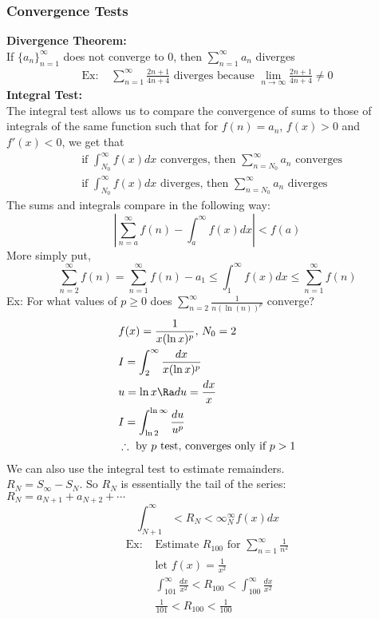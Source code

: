 \subsubsection{Convergence Tests}
\textbf{Divergence Theorem:}\\
If $\{a_n\}_{n=1}^\infty$ does not converge to 0, then $\displaystyle{\sum_{n=1}^\infty a_n}$ diverges\\
\begin{align*}
    \text{Ex: }&\sum_{n=1}^\infty\frac{2n+1}{4n+4}\text{ diverges because }\lim_{n\to\infty}\frac{2n+1}{4n+4}\neq 0
\end{align*}
\textbf{Integral Test:}\\
The integral test allows us to compare the convergence of sums to those of integrals of the same function such that for $f(n)=a_n$, $f(x)>0$ and $f'(x)<0$, we get that
\begin{align*}
    &\text{if }\int_{N_0}^\infty f(x)dx\text{ converges, then }\sum_{n=N_0}^\infty a_n\text{ converges}\\
    &\text{if }\int_{N_0}^\infty f(x)dx\text{ diverges, then }\sum_{n=N_0}^\infty a_n\text{ diverges}
\end{align*}
The sums and integrals compare in the following way:\\
$$\left|\sum_{n=a}^\infty f(n)-\int_a^\infty f(x)dx\right|<f(a)$$
More simply put,
$$\sum_{n=2}^\infty f(n)=\sum_{n=1}^\infty f(n)-a_1\leq\int_1^\infty f(x)dx\leq \sum_{n=1}^\infty f(n)$$
Ex: For what values of $p\geq 0$ does $\displaystyle{\sum_{n=2}^\infty\frac{1}{n(\ln(n))^p}}$ converge?
\begin{align*}
    &f(x)=\frac{1}{x(\ln x)^p},\,N_0=2\\
    &I=\int_2^\infty\frac{dx}{x(\ln x)^p}\\
    &u=\ln x\Ra du=\frac{dx}{x}\\
    &I=\int_{\ln2}^{\ln\infty}\frac{du}{u^p}\\
    &\therefore\text{ by $p$ test, converges only if }p>1
\end{align*}
We can also use the integral test to estimate remainders.\\
$R_N=S_\infty-S_N$. So $R_N$ is essentially the tail of the series: $R_N=a_{N+1}+a_{N+2}+\cdots$
$$\int_{N+1}^\infty<R_N<\infty_N^\infty f(x)dx$$
\begin{align*}
    \text{Ex: }&\text{Estimate $R_{100}$ for }\sum_{n=1}^\infty\frac{1}{n^2}\\
    &\text{let }f(x)=\frac{1}{x^2}\\
    &\int_{101}^\infty\frac{dx}{x^2}<R_{100}<\int_{100}^\infty\frac{dx}{x^2}\\
    &\frac{1}{101}<R_{100}<\frac{1}{100}
\end{align*}
